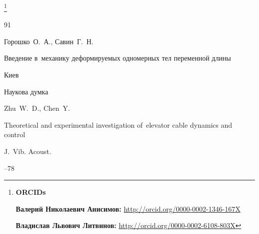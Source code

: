 \thanks{{\bf ORCIDs}



{\bf Валерий Николаевич Анисимов:} \url{http://orcid.org/0000-0002-1346-167X}



{\bf Владислав Львович Литвинов:} \url{http://orcid.org/0000-0002-6108-803X}



}







\RusRef



\begin{thebibliography}{91}




\by Горошко~О.~А., Савин~Г.~Н.

\book Введение в~механику деформируемых одномерных тел переменной длины

\publaddr Киев

\publ Наукова думка













\by Zhu~W.~D., Chen~Y.

\paper Theoretical and experimental investigation of~elevator cable dynamics and control

\jour J.~Vib. Acoust.




--78








\end{thebibliography}
